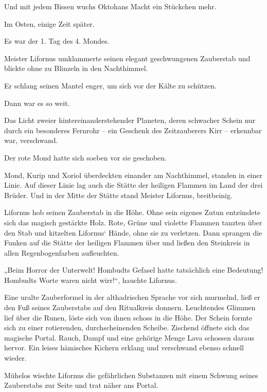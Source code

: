 Und mit jedem Bissen wuchs Oktohans Macht ein Stückchen mehr.\bigskip






Im Osten, einige Zeit später.\bigskip



Es war der 1. Tag des 4. Mondes.

Meister Lifornus umklammerte seinen elegant geschwungenen Zauberstab und blickte ohne zu Blinzeln in den Nachthimmel.

Er schlang seinen Mantel enger, um sich vor der Kälte zu schützen.

Dann war es so weit.

Das Licht zweier hintereinanderstehender Planeten, deren schwacher Schein nur durch ein besonderes Fernrohr – ein Geschenk des Zeitzauberers Kirr – erkennbar war, verschwand.

Der rote Mond hatte sich soeben vor sie geschoben.

Mond, Kurip und Xoriol überdeckten einander am Nachthimmel, standen in einer Linie. Auf dieser Linie lag auch die Stätte der heiligen Flammen im Land der drei Brüder. Und in der Mitte der Stätte stand Meister Lifornus, breitbeinig.

Lifornus hob seinen Zauberstab in die Höhe. Ohne sein eigenes Zutun entzündete sich das magisch gestärkte Holz. Rote, Grüne und violette Flammen tanzten über den Stab und kitzelten Lifornus‘ Hände, ohne sie zu verletzen. Dann sprangen die Funken auf die Stätte der heiligen Flammen über und ließen den Steinkreis in allen Regenbogenfarben aufleuchten.

„Beim Horror der Unterwelt! Hombudts Gefasel hatte tatsächlich eine Bedeutung! Hombudts Worte waren nicht wirr!“, hauchte Lifornus.

Eine uralte Zauberformel in der althadrischen Sprache vor sich murmelnd, ließ er den Fuß seines Zauberstabs auf den Ritualkreis donnern. Leuchtendes Glimmen lief über die Runen, löste sich von ihnen schoss in die Höhe. Der Schein formte sich zu einer rotierenden, durchscheinenden Scheibe. Zischend öffnete sich das magische Portal. Rauch, Dampf und eine gehörige Menge Lava schossen daraus hervor. Ein leises hämisches Kichern erklang und verschwand ebenso schnell wieder.

Mühelos wischte Lifornus die gefährlichen Substanzen mit einem Schwung seines Zauberstabs zur Seite und trat näher ans Portal.

